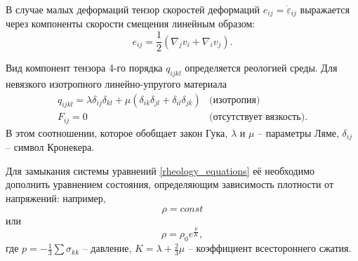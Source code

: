 В случае малых деформаций тензор скоростей деформаций $e_{ij}=\dot{\varepsilon}_{ij}$ 
выражается через компоненты скорости смещения линейным образом:
\begin{equation}
e_{ij}=\frac{1}{2}(\nabla_j v_i+\nabla_i v_j).
\end{equation}

Вид компонент тензора 4-го порядка $q_{ijkl}$ определяется реологией среды. Для 
невязкого изотропного линейно-упругого материала
\begin{eqnarray}
\label{tensor_qijkl}
q_{ijkl}=\lambda\delta_{ij}\delta_{kl}+\mu(\delta_{ik}\delta_{jl}+\delta_{il}
\delta_{jk}) & \textrm {(изотропия)} \nonumber\\
F_{ij}=0 & \textrm {(отсутствует вязкость).}
\end{eqnarray}
В этом соотношении, которое обобщает закон Гука, $\lambda$ и $\mu$ -- параметры
Ляме, $\delta_{ij}$ -- символ Кронекера.

Для замыкания системы уравнений \ref{rheology_equations} её необходимо дополнить
уравнением состояния, определяющим зависимость плотности от напряжений:
например, $$\rho=const$$ или
$$\rho=\rho_0e^{\frac{p}{K}},$$
где $p=-\frac{1}{3}\sum\sigma_{kk}$ -- давление, $K=\lambda+\frac{2}{3}\mu$ --
коэффициент всестороннего сжатия.

